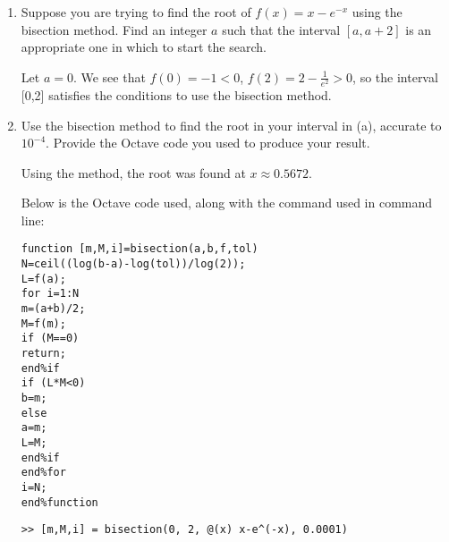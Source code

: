 \documentclass{article}
\theoremstyle{plain} %
\numberwithin{thm}{section} %
\theoremstyle{definition}
\begin{document}
    \newpage
    \begin{question}{6}
        \begin{enumerate}[label=(\alph*)]
            \item Suppose you are trying to find the root of \(f(x) = x - e^{-x}\) using the bisection method. Find an integer \(a\) such that the interval \([a, a+2]\) is an appropriate one in which to start the search.
            
            Let \(a = 0\). We see that \(f(0) = -1 < 0\), \(f(2) = 2 - \frac{1}{e^2} > 0\), so the interval [0,2] satisfies the conditions to use the bisection method.

            \item Use the bisection method to find the root in your interval in (a), accurate to \(10^{-4}\). Provide the Octave code you used to produce your result.
            
            Using the method, the root was found at \(x \approx 0.5672\).

            Below is the Octave code used, along with the command used in command line:
            \begin{lstlisting}
function [m,M,i]=bisection(a,b,f,tol)
N=ceil((log(b-a)-log(tol))/log(2));
L=f(a);
for i=1:N
m=(a+b)/2;
M=f(m);
if (M==0)
return;
end%if
if (L*M<0)
b=m;
else
a=m;
L=M;
end%if
end%for
i=N;
end%function
            \end{lstlisting}
            \begin{lstlisting}[numbers=none]
>> [m,M,i] = bisection(0, 2, @(x) x-e^(-x), 0.0001)
            \end{lstlisting}
        \end{enumerate}
    \end{question}
\end{document}

